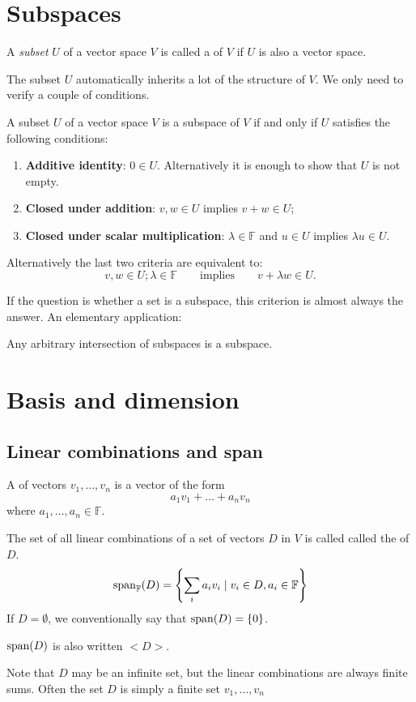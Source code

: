 \section{Subspaces}
\begin{definition}
A \textit{subset} $U$ of a vector space $V$ is called a  of $V$ if $U$ is also a vector space.
\end{definition}
The subset $U$ automatically inherits a lot of the structure of $V$. We only need to verify a couple of conditions.
\begin{proposition} \label{prop:subspaceCriterion}
A subset $U$ of a vector space $V$ is a subspace of $V$ \textup{if and only if} $U$ satisfies the following conditions:
\begin{enumerate}
\item \textbf{Additive identity}: $0 \in U$. Alternatively it is enough to show that $U$ is not empty.
\item \textbf{Closed under addition}: $v,w \in U$ implies $v+w\in U$;
\item \textbf{Closed under scalar multiplication}: $\lambda \in \mathbb{F}$ and $u\in U$ implies $\lambda u \in U$.
\end{enumerate}
\end{proposition}
Alternatively the last two criteria are equivalent to:
\[ v,w\in U; \lambda \in \mathbb{F} \qquad \text{implies} \qquad v+\lambda w \in U. \]

If the question is whether a set is a subspace, this criterion is almost always the answer. An elementary application:
\begin{proposition}
Any arbitrary intersection of subspaces is a subspace.
\end{proposition}

\section{Basis and dimension}
\subsection{Linear combinations and span}
\begin{definition}
A  of vectors $v_1, \ldots, v_n$ is a vector of the form
\[ a_1v_1 + \ldots + a_nv_n \]
where $a_1, \ldots, a_n \in \mathbb{F}$.
\end{definition}
\begin{definition}
The set of all linear combinations of a set of vectors $D$ in $V$ is called called the  of $D$.
\[ \operatorname{span}_{\mathbb{F}}(D) = \left\{ \sum_i a_iv_i \;|\; v_i\in D, a_i \in \mathbb{F} \right\} \]
If $D=\emptyset$, we conventionally say that $\operatorname{span}(D) = \{0\}$.

$\operatorname{span}(D)$ is also written $<D>$.
\end{definition}
Note that $D$ may be an infinite set, but the linear combinations are always finite sums. Often the set $D$ is simply a finite set $v_1,\ldots, v_n$

